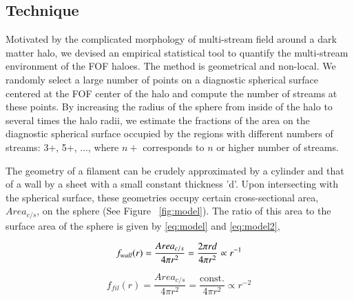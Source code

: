 \subsection{Technique}

Motivated by the complicated morphology of multi-stream field around a dark matter halo, we devised an empirical 
statistical tool to quantify the multi-stream environment of the FOF haloes. The method is geometrical and non-local.
We  randomly select a large number of points on a diagnostic spherical surface centered at the FOF center of the halo 
and compute the number of streams  at these points. By increasing the radius of the sphere from inside of the halo to several times the halo radii, we estimate  the fractions of the area on the diagnostic spherical surface occupied by the regions with different numbers of streams:
3+, 5+, ..., where $n+$ corresponds to $n$ or higher number of streams. 

 
The geometry of a filament can be crudely approximated by a cylinder and that of a wall by a sheet with a small constant thickness 'd'. Upon intersecting with the spherical surface, these geometries occupy certain cross-sectional area, $Area_{c/s}$, on the sphere (See Figure ~\ref{fig:model}). The ratio of this area to the surface area of the sphere  is given by \autoref{eq:model} and \autoref{eq:model2},



\begin{equation} \label{eq:model}
  f_{wall} (r) = \frac{Area_{c/s}}{4\pi r^2} = \frac{2\pi r d}{4\pi r^2} \propto r^{-1} \\
 \end{equation}

 
 
  \begin{equation} \label{eq:model2}
 f_{fil} (r) = \frac{Area_{c/s}}{4\pi r^2} = \frac{\text{const.}}{4\pi r^2} \propto r^{-2}
 \end{equation}

